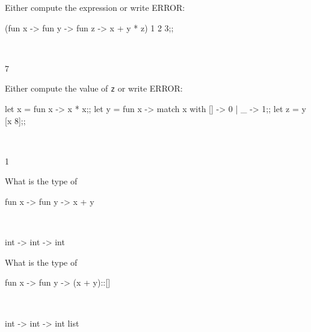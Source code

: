 

\renewcommand\AUTHOR{nweadick1@cougars.ccis.edu} %


\topmattertwo

\nextq
Either compute the expression or write ERROR:
\begin{console}
(fun x -> fun y -> fun z -> x + y * z) 1 2 3;;
\end{console}
\\
\ANSWER
\begin{answercode}
7
\end{answercode}

\nextq
Either compute the value of \verb!z! or write ERROR:
\begin{console}
let x = fun x -> x * x;;
let y = fun x -> match x with [] -> 0 | _ -> 1;;
let z = y [x 8];;
\end{console}
\\
\ANSWER
\begin{answercode}
1
\end{answercode}

\nextq
What is the type of 
\begin{console}
fun x -> fun y -> x + y
\end{console}
\\
\ANSWER
\begin{answercode}
int -> int -> int
\end{answercode}

\nextq
What is the type of 
\begin{console}
fun x -> fun y -> (x + y)::[]
\end{console}
\\
\ANSWER
\begin{answercode}
int -> int -> int list
\end{answercode}

\newpage



